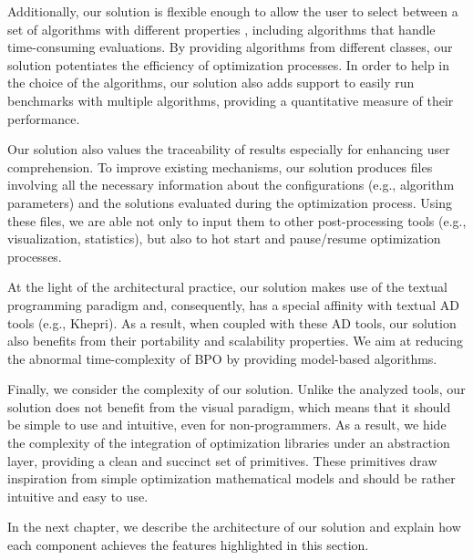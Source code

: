 Additionally, our solution is flexible enough to allow the user to select between a set of algorithms with different properties \cite{Wolpert1997NFLT}, including algorithms that handle time-consuming evaluations. By providing algorithms from different classes, our solution potentiates the efficiency of optimization processes. In order to help in the choice of the algorithms, our solution also adds support to easily run benchmarks with multiple algorithms, providing a quantitative measure of their performance. 

Our solution also values the traceability of results especially for enhancing user comprehension. To improve existing mechanisms, our solution produces files involving all the necessary information about the configurations (e.g., algorithm parameters) and the solutions evaluated during the optimization process. Using these files, we are able not only to input them to other post-processing tools (e.g., visualization, statistics), but also to hot start and pause/resume optimization processes.

At the light of the architectural practice, our solution makes use of the textual programming paradigm and, consequently, has a special affinity with textual \ac{AD} tools (e.g., Khepri). As a result, when coupled with these \ac{AD} tools, our solution also benefits from their portability and scalability properties. We aim at reducing the abnormal time-complexity of \ac{BPO} by providing model-based algorithms. 

Finally, we consider the complexity of our solution. Unlike the analyzed tools, our solution does not benefit from the visual paradigm, which means that it should be simple to use and intuitive, even for non-programmers. As a result, we hide the complexity of the integration of optimization libraries under an abstraction layer, providing a clean and succinct set of primitives. These primitives draw inspiration from simple optimization mathematical models and should be rather intuitive and easy to use. 

In the next chapter, we describe the architecture of our solution and explain how each component achieves the features highlighted in this section.
